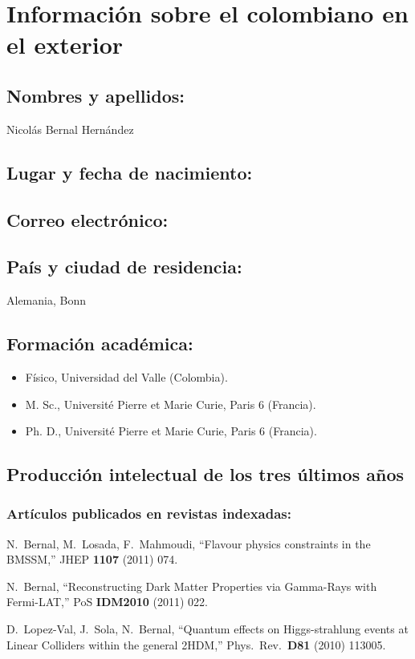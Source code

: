 \section{Información sobre el colombiano en el exterior}
\subsection{Nombres y apellidos: }
Nicolás Bernal Hernández
\subsection{Lugar y fecha de nacimiento: }
\fnbernal
\subsection{Correo electrónico: }
\embernal
\subsection{País y ciudad de residencia: }
Alemania, Bonn
\subsection{Formación académica:}
\begin{itemize}
\item Físico, Universidad del Valle (Colombia).
\item M. Sc.,  Université Pierre et Marie Curie, Paris 6 (Francia).
\item Ph. D.,  Université Pierre et Marie Curie, Paris 6 (Francia).
\end{itemize}
\subsection{Producción intelectual de los tres últimos años}
\subsubsection{Artículos publicados en revistas indexadas:}
  N.~Bernal, M.~Losada, F.~Mahmoudi,
  ``Flavour physics constraints in the BMSSM,''
  JHEP {\bf 1107 } (2011)  074.

  N.~Bernal,
  ``Reconstructing Dark Matter Properties via Gamma-Rays with Fermi-LAT,''
  PoS {\bf IDM2010 } (2011)  022.

  D.~Lopez-Val, J.~Sola, N.~Bernal,
  ``Quantum effects on Higgs-strahlung events at Linear Colliders within the general 2HDM,''
  Phys.\ Rev.\  {\bf D81 } (2010)  113005.

